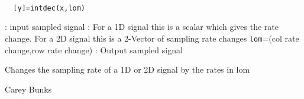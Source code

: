 
\begin{mandesc}
   \\ %
\end{mandesc}
\begin{calling_sequence}
\begin{verbatim}
  [y]=intdec(x,lom)  
\end{verbatim}
\end{calling_sequence}
\begin{parameters}
  \begin{varlist}
    : input sampled signal
    : For a 1D signal this is a scalar which gives the rate
    change. For a 2D signal this is a 2-Vector of sampling rate changes
    \verb!lom!=(col rate change,row rate change) 
    : Output sampled signal
  \end{varlist}
\end{parameters}
\begin{mandescription}
  Changes the sampling rate of a 1D or 2D signal by the rates in lom
\end{mandescription}
\begin{authors}
  Carey Bunks
\end{authors}
